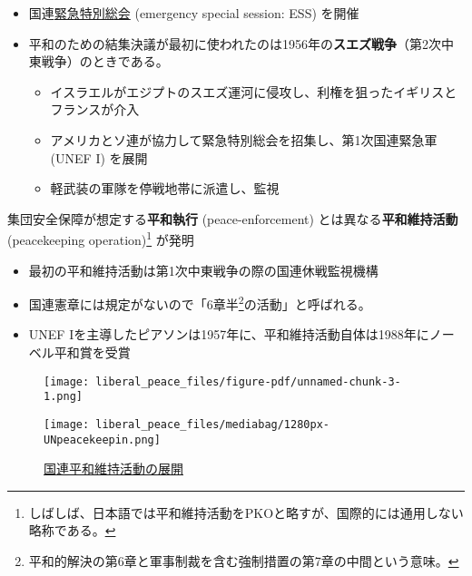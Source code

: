 \documentclass[
  xelatex,
  ja=standard]{bxjsarticle}
\providecommand{\tightlist}{%
  \setlength{\itemsep}{0pt}\setlength{\parskip}{0pt}}\usepackage{longtable,booktabs,array}
\begin{document}
\begin{itemize}
\tightlist
\item
  国連\href{https://www.un.org/en/ga/sessions/emergency.shtml}{緊急特別総会}
  (emergency special session: ESS) を開催
\item
  平和のための結集決議が最初に使われたのは1956年の\textbf{スエズ戦争}（第2次中東戦争）のときである。

  \begin{itemize}
  \tightlist
  \item
    イスラエルがエジプトのスエズ運河に侵攻し、利権を狙ったイギリスとフランスが介入
  \item
    アメリカとソ連が協力して緊急特別総会を招集し、第1次国連緊急軍 (UNEF
    I) を展開
  \item
    軽武装の軍隊を停戦地帯に派遣し、監視
  \end{itemize}
\end{itemize}

集団安全保障が想定する\textbf{平和執行} (peace-enforcement)
とは異なる\textbf{平和維持活動} (peacekeeping operation)\footnote{しばしば、日本語では平和維持活動をPKOと略すが、国際的には通用しない略称である。}
が発明

\begin{itemize}
\tightlist
\item
  最初の平和維持活動は第1次中東戦争の際の国連休戦監視機構
\item
  国連憲章には規定がないので「6章半\footnote{平和的解決の第6章と軍事制裁を含む強制措置の第7章の中間という意味。}の活動」と呼ばれる。
\item
  UNEF
  Iを主導したピアソンは1957年に、平和維持活動自体は1988年にノーベル平和賞を受賞
\end{itemize}

\begin{figure}[htpb]

{\centering \texttt{[image: liberal\_peace\_files/figure-pdf/unnamed-chunk-3-1.png]}

}

\end{figure}

\begin{figure}[htpb]

{\centering \texttt{[image: liberal\_peace\_files/mediabag/1280px-UNpeacekeepin.png]}

}

\caption{\href{https://commons.wikimedia.org/wiki/File:UNpeacekeeping.svg}{国連平和維持活動の展開}}

\end{figure}
\end{document}
